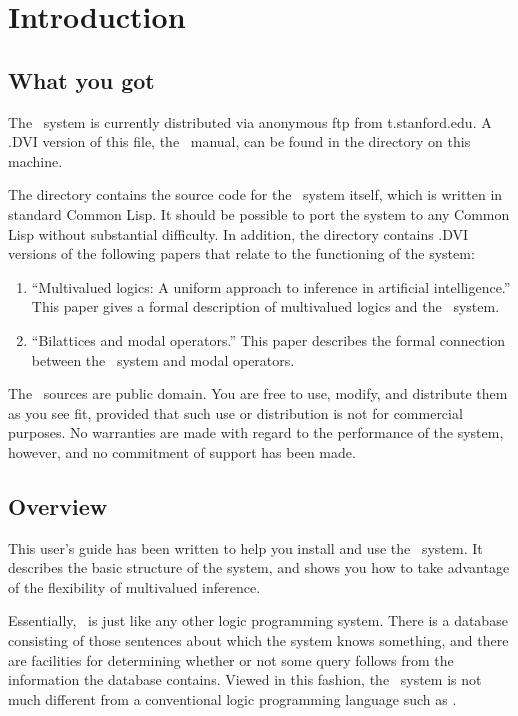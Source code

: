 \makeindex



\tableofcontents
\clearpage

\section{Introduction}
\subsection{What you got}

The \mvl\ system is currently distributed via anonymous ftp from
t.stanford.edu.  A .DVI version of this file, the \mvl\ manual,
can be found in the  directory on this machine.

The  directory contains the source code for the \mvl\ system
itself, which is written in standard Common Lisp.  It should be
possible to port the system to any Common Lisp without substantial
difficulty.  In addition, the  directory contains .DVI
versions of the following papers that relate to the functioning of the
system:
 \begin{enumerate}
 \item ``Multivalued logics: A uniform approach to inference in
artificial intelligence.''  This paper gives a formal description of
multivalued logics and the \mvl\ system.
 \item ``Bilattices and modal operators.''  This paper describes the
formal connection between the \mvl\ system and modal operators.
 \end{enumerate}

The \mvl\ sources are public domain.  You are free to use, modify, and
distribute them as you see fit, provided that such use or distribution
is not for commercial purposes.  No warranties are made with regard to
the performance of the system, however, and no commitment of support
has been made.

\subsection{Overview}

This user's guide has been written to help you install and use the \mvl\
system.  It describes the basic structure of the system, and shows you
how to take advantage of the flexibility of multivalued inference.

Essentially, \mvl\ is just like any other logic programming system.
There is a database consisting of those sentences about which the
system knows something, and there are facilities for determining
whether or not some query follows from the information the database
contains.  Viewed in this fashion, the \mvl\ system is not much
different from a conventional logic programming language such as
\prolog.

